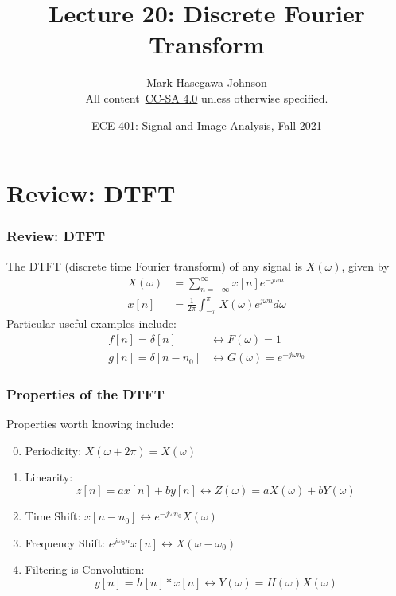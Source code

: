 \documentclass{beamer}
\title{Lecture 20: Discrete Fourier Transform}
\author{Mark Hasegawa-Johnson\\All content~\href{https://creativecommons.org/licenses/by-sa/4.0/}{CC-SA 4.0} unless otherwise specified.}
\date{ECE 401: Signal and Image Analysis, Fall 2021}
\begin{document}
\begin{frame}
  \maketitle
\end{frame}

\begin{frame}
  \tableofcontents
\end{frame}

\section[DTFT]{Review: DTFT}
\setcounter{subsection}{1}

\begin{frame}
  \frametitle{Review: DTFT}

  The DTFT (discrete time Fourier transform) of any signal is
  $X(\omega)$, given by
  \begin{align*}
    X(\omega) &= \sum_{n=-\infty}^\infty x[n]e^{-j\omega n}\\
    x[n] &= \frac{1}{2\pi}\int_{-\pi}^\pi X(\omega)e^{j\omega n}d\omega
  \end{align*}
  Particular useful examples include:
  \begin{align*}
    f[n]=\delta[n] &\leftrightarrow F(\omega)=1\\
    g[n]=\delta[n-n_0] &\leftrightarrow G(\omega)=e^{-j\omega n_0}
  \end{align*}
\end{frame}

\begin{frame}
  \frametitle{Properties of the DTFT}

  Properties worth knowing  include:
  \begin{enumerate}
    \setcounter{enumi}{-1}
  \item Periodicity: $X(\omega+2\pi)=X(\omega)$
  \item Linearity:
    \[z[n]=ax[n]+by[n]\leftrightarrow Z(\omega)=aX(\omega)+bY(\omega)
    \]
  \item Time Shift: $x[n-n_0]\leftrightarrow e^{-j\omega n_0}X(\omega)$
  \item Frequency Shift: $e^{j\omega_0 n}x[n]\leftrightarrow X(\omega-\omega_0)$
  \item Filtering is Convolution:
    \[
    y[n]=h[n]\ast x[n]\leftrightarrow Y(\omega)=H(\omega)X(\omega)
    \]
  \end{enumerate}
\end{frame}
\end{document}
